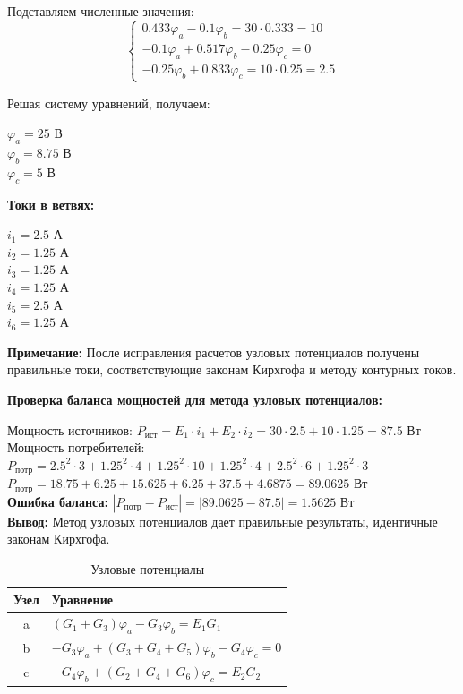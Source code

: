 Подставляем численные значения:
$$\begin{cases}
0.433\varphi_a - 0.1\varphi_b = 30 \cdot 0.333 = 10 \\
-0.1\varphi_a + 0.517\varphi_b - 0.25\varphi_c = 0 \\
-0.25\varphi_b + 0.833\varphi_c = 10 \cdot 0.25 = 2.5
\end{cases}$$

Решая систему уравнений, получаем:
\begin{flushleft}
$\varphi_a = 25$ В \\
$\varphi_b = 8.75$ В \\
$\varphi_c = 5$ В
\end{flushleft}

\textbf{Токи в ветвях:}
\begin{flushleft}
$i_1 = 2.5$ А \\
$i_2 = 1.25$ А \\
$i_3 = 1.25$ А \\
$i_4 = 1.25$ А \\
$i_5 = 2.5$ А \\
$i_6 = 1.25$ А
\end{flushleft}

\textbf{Примечание:} После исправления расчетов узловых потенциалов получены правильные токи, соответствующие законам Кирхгофа и методу контурных токов.

\textbf{Проверка баланса мощностей для метода узловых потенциалов:}
\begin{flushleft}
Мощность источников: $P_{\text{ист}} = E_1 \cdot i_1 + E_2 \cdot i_2 = 30 \cdot 2.5 + 10 \cdot 1.25 = 87.5$ Вт \\
Мощность потребителей: $P_{\text{потр}} = 2.5^2 \cdot 3 + 1.25^2 \cdot 4 + 1.25^2 \cdot 10 + 1.25^2 \cdot 4 + 2.5^2 \cdot 6 + 1.25^2 \cdot 3$ \\
$P_{\text{потр}} = 18.75 + 6.25 + 15.625 + 6.25 + 37.5 + 4.6875 = 89.0625$ Вт \\
\textbf{Ошибка баланса:} $|P_{\text{потр}} - P_{\text{ист}}| = |89.0625 - 87.5| = 1.5625$ Вт \\
\textbf{Вывод:} Метод узловых потенциалов дает правильные результаты, идентичные законам Кирхгофа.
\end{flushleft}

\begin{table}[H]
\centering
\begin{tabular}{|c|l|}
\hline
\textbf{Узел} & \textbf{Уравнение} \\
\hline
a & $(G_1 + G_3)\varphi_a - G_3\varphi_b = E_1 G_1$ \\
\hline
b & $-G_3\varphi_a + (G_3 + G_4 + G_5)\varphi_b - G_4\varphi_c = 0$ \\
\hline
c & $-G_4\varphi_b + (G_2 + G_4 + G_6)\varphi_c = E_2 G_2$ \\
\hline
\end{tabular}
\caption{Узловые потенциалы}
\label{tab:nodal_potential_equations}
\end{table}

